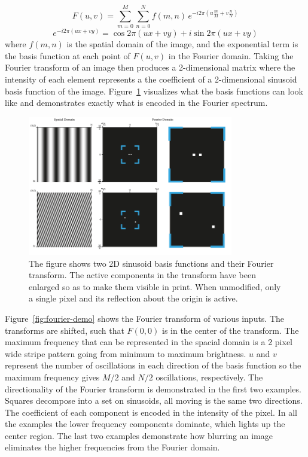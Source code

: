 \begin{equation}
  F(u,v) = \sum_{m=0}^{M}\sum_{n=0}^{N}f(m,n)\,e^{-i2\pi\left(u\frac{m}{M}+v\frac{n}{N}\right)}
\end{equation}%
\begin{equation*}
  e^{-i2\pi\left(ux+vy\right)} = \cos 2\pi\left(ux+vy\right) + i\sin 2\pi\left(ux+vy\right)
\end{equation*}
where \(f(m,n)\) is the spatial domain of the image, and the exponential term is the basis function at each point of \(F(u,v)\) in the Fourier domain.
Taking the Fourier transform of an image then produces a 2-dimensional matrix where the intensity of each element represents a the coefficient of a 2-dimensional sinusoid basis function of the image.
Figure~\ref{fig:fourier-sinusoid} visualizes what the basis functions can look like and demonstrates exactly what is encoded in the Fourier spectrum.

\begin{figure}[htbp]
  \centering
  \includegraphics[width=0.8\textwidth]{figs/method/fourier/fourier-sinusoid.pdf}
  \caption[Fourier transform of sinusoid]{The figure shows two 2D sinusoid basis functions and their Fourier transform.
The active components in the transform have been enlarged so as to make them visible in print.
When unmodified, only a single pixel and its reflection about the origin is active.}\label{fig:fourier-sinusoid}
\end{figure}

Figure~\ref{fig:fourier-demo} shows the Fourier transform of various inputs.
The transforms are shifted, such that \(F(0,0)\) is in the center of the transform.
The maximum frequency that can be represented in the spacial domain is a 2 pixel wide stripe pattern going from minimum to maximum brightness.
\(u\) and \(v\) represent the number of oscillations in each direction of the basis function so the maximum frequency gives \(M/ 2\) and \(N/ 2\) oscillations, respectively.
The directionality of the Fourier transform is demonstrated in the first two examples.
Squares decompose into a set on sinusoids, all moving is the same two directions.
The coefficient of each component is encoded in the intensity of the pixel.
In all the examples the lower frequency components dominate, which lights up the center region.
The last two examples demonstrate how blurring an image eliminates the higher frequencies from the Fourier domain.

